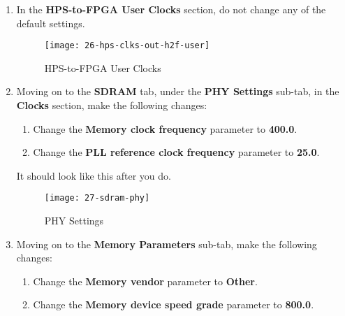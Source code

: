 \begin{flushleft}
\begin{enumerate}[
	label=\textbf{Step \arabic*.},
	leftmargin=*,
	widest={00},
	align=left]
\item In the \textbf{HPS-to-FPGA User Clocks} section, do not change any of the default settings.

\begin{figure}[H]
\centering
\texttt{[image: 26-hps-clks-out-h2f-user]}
\caption{HPS-to-FPGA User Clocks}
\label{fig:26-hps-clks-out-h2f-user}
\end{figure}

\item Moving on to the \textbf{SDRAM} tab, under the \textbf{PHY Settings} sub-tab, in the \textbf{Clocks} section,  make the following changes:

\begin{enumerate}[
	label=\textbf{Step \arabic{enumi}\alph*.},
	leftmargin=*,
	align=left]

\item Change the \textbf{Memory clock frequency} parameter to \textbf{400.0}.

\item Change the \textbf{PLL reference clock frequency} parameter to \textbf{25.0}.

\end{enumerate}

It should look like this after you do.

\begin{figure}[H]
\centering
\texttt{[image: 27-sdram-phy]}
\caption{PHY Settings}
\label{fig:27-sdram-phy}
\end{figure}

\newpage

\item Moving on to the \textbf{Memory Parameters} sub-tab, make the following changes:

\begin{enumerate}[
	label=\textbf{Step \arabic{enumi}\alph*.},
	leftmargin=*,
	align=left]

\item Change the \textbf{Memory vendor} parameter to \textbf{Other}.

\item Change the \textbf{Memory device speed grade} parameter to \textbf{800.0}.


\end{enumerate}
\end{enumerate}
\end{flushleft}
